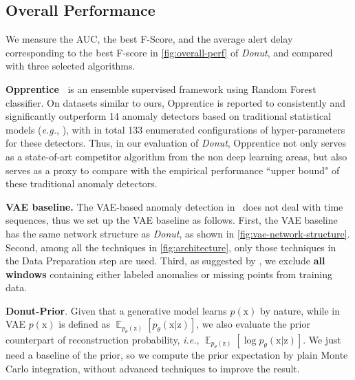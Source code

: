\documentclass[sigconf]{acmart}
\newcommand\compactvspace[1]{\vspace{#1}}
\newcommand\compactvspace[1]{}
\newcommand{\DONUT}{\textit{Donut}}
\newcommand{\IE}{\textit{i.e.}}
\newcommand{\vv}[1]{\bm{\mathrm{{#1}}}}
\newcommand{\EEE}[2]{\operatorname{\mathbb{E}}_{{#1}}\left[{#2}\right]}
\begin{document}

\compactvspace{-1em}
\subsection{Overall Performance}
\label{sec:overall-performance}

We measure the AUC, the best F-Score, and the average alert delay corresponding to the best F-score in \cref{fig:overall-perf} of \DONUT{}, and compared with three selected algorithms.

\textbf{Opprentice~\cite{opprentice}} is an ensemble supervised framework using Random Forest classifier. On datasets similar to ours, Opprentice is reported to consistently and significantly outperform 14 anomaly detectors based on traditional statistical models (\textit{e.g.}, \cite{historical-avg,MA,arma,arima,kalman,holt-winters,TSD,svd,wavelet}), with in total 133 enumerated configurations of hyper-parameters for these detectors. Thus, in our evaluation of \DONUT{}, Opprentice not only serves as a state-of-art competitor algorithm from the non deep learning areas, but also serves as a proxy to compare with the empirical performance ``upper bound" of these traditional anomaly detectors.

\textbf{VAE baseline.} The VAE-based anomaly detection in~\cite{vae-ad} does not deal with time sequences, thus we set up the VAE baseline as follows. First, the VAE baseline has the same network structure as \DONUT{}, as shown in \cref{fig:vae-network-structure}. Second, among all the techniques in \cref{fig:architecture}, only those techniques in the Data Preparation step are used. Third, as suggested by \cite{vae-ad}, we exclude \textbf{all windows} containing either labeled anomalies or missing points from training data.


\textbf{Donut-Prior}. Given that a generative model learns $p(\vv{x})$ by nature, while in VAE $p(\vv{x})$ is defined as $\EEE{p_{\theta}(\vv{z})}{p_{\theta}(\vv{x}|\vv{z})}$, we also evaluate the prior counterpart of reconstruction probability, \IE, $\EEE{p_{\theta}(\vv{z})}{\log p_{\theta}(\vv{x}|\vv{z})}$.  We just need a baseline of the prior, so we compute the prior expectation by plain Monte Carlo integration, without advanced techniques to improve the result.
\end{document}
